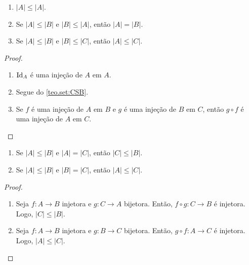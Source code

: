 \begin{proposition}
    \leavevmode
        \begin{enumerate}[leftmargin=*, align=left, label=\textbf{(\alph*)}]
            \item $|A| \leq |A|$.
            \item Se $|A| \leq |B|$ e $|B| \leq |A|$, então $|A| = |B|$.
            \item Se $|A| \leq |B|$ e $|B| \leq |C|$, então $|A| \leq |C|$.
        \end{enumerate}
\end{proposition}

\begin{proof}
    \leavevmode
        \begin{enumerate}[leftmargin=*, align=left, label=\textbf{(\alph*)}]
            \item $\operatorname{Id}_A$ é uma injeção de $A$ em $A$. \blackproof
            \item Segue do \cref{teo.set:CSB}. \blackproof
            \item Se $f$ é uma injeção de $A$ em $B$ e $g$ é uma injeção de $B$ em $C$, então $g \circ f$ é uma injeção de $A$ em $C$. \blackproof
        \end{enumerate}
\end{proof}

\begin{proposition}
    \leavevmode
        \begin{enumerate}[leftmargin=*, align=left, label=\textbf{(\alph*)}]
            \item Se $|A| \leq |B|$ e $|A| = |C|$, então $|C| \leq |B|$.
            \item Se $|A| \leq |B|$ e $|B| = |C|$, então $|A| \leq |C|$.
        \end{enumerate}
\end{proposition}

\begin{proof}
    \leavevmode
        \begin{enumerate}[leftmargin=*, align=left, label=\textbf{(\alph*)}]
            \item Seja $f : A \to B$ injetora e $g : C \to A$ bijetora. Então, $f \circ g : C \to B$ é injetora. Logo, $|C| \leq |B|$. \blackproof
            \item Seja $f : A \to B$ injetora e $g : B \to C$ bijetora. Então, $g \circ f : A \to C$ é injetora. Logo, $|A| \leq |C|$. \blackproof
        \end{enumerate}
\end{proof}

